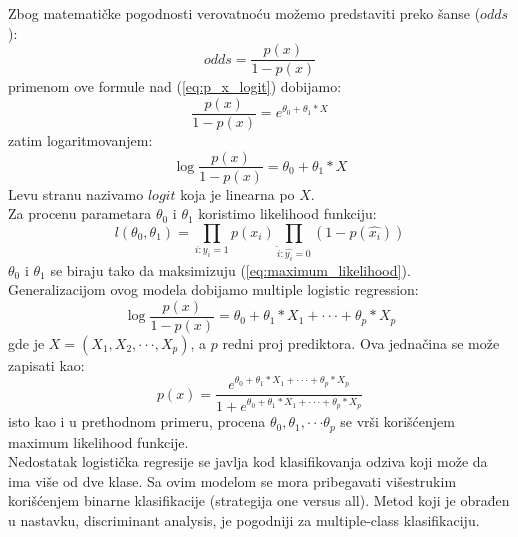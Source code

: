 Zbog matematičke pogodnosti verovatnoću možemo predstaviti preko šanse ($odds$):
\begin{equation}
  odds = \frac{p\left(x\right)}{1-p\left(x\right)}
\end{equation}
primenom ove formule nad (\ref{eq:p_x_logit}) dobijamo:
\begin{equation}
  \frac{p\left(x\right)}{1-p\left(x\right)} = e^{\theta_0 + \theta_1 * X}
\end{equation}
zatim logaritmovanjem:
\begin{equation}
  \log \frac{p\left(x\right)}{1-p\left(x\right)} = \theta_0+ \theta_1*X
\end{equation}
Levu stranu nazivamo $logit$ koja je linearna po $X$. \\

Za procenu parametara $\theta_0$ i $\theta_1$ koristimo likelihood funkciju:
\begin{equation} \label{eq:maximum_likelihood}
  l\left(\theta_0, \theta_1\right) =
  \prod_{i:y_i = 1} p\left(x_i\right)
  \prod_{\hat{i}:\hat{y_i} = 0} \left(1 - p\left(\hat{x_i}\right)\right)
\end{equation}
$\theta_0$ i $\theta_1$ se biraju tako da maksimizuju (\ref{eq:maximum_likelihood}). \\

Generalizacijom ovog modela dobijamo multiple logistic regression:
\begin{equation}
  \log \frac{p\left(x\right)}{1-p\left(x\right)} = \theta_0+ \theta_1*X_1 + \cdot\cdot\cdot + \theta_p*X_p
\end{equation}
gde je $X = (X_1, X_2, \cdot\cdot\cdot, X_p)$, a $p$ redni proj prediktora.
Ova jednačina se može zapisati kao:
\begin{equation} \label{eq:logistic_function}
  p(x) = \frac{e^{\theta_0 + \theta_1 * X_1 + \cdot\cdot\cdot + \theta_p*X_p}}{1 + e^{\theta_0 + \theta_1 * X_1 + \cdot\cdot\cdot + \theta_p*X_p}}
\end{equation}
isto kao i u prethodnom primeru, procena $\theta_0, \theta_1, \cdot\cdot\cdot \theta_p$ se vrši
korišćenjem maximum likelihood funkcije. \\

Nedostatak logistička regresije se javlja kod klasifikovanja odziva koji može da
ima više od dve klase. Sa ovim modelom se mora pribegavati višestrukim
korišćenjem binarne klasifikacije (strategija one versus all). Metod koji je
obrađen u nastavku, discriminant analysis, je pogodniji za multiple-class
klasifikaciju. \\
